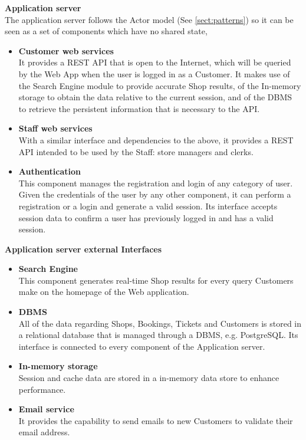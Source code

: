 \textbf{Application server}\\
The application server follows the Actor model (See \ref{sect:patterns}) so it can be seen as a set of components which have no shared state, 
\begin{itemize}
    \item \textbf{Customer web services}\\ It provides a REST API that is open to the Internet, which will be queried by the Web App when the user is logged in as a Customer. It makes use of the Search Engine module to provide accurate Shop results, of the In-memory storage to obtain the data relative to the current session, and of the DBMS to retrieve the persistent information that is necessary to the API.
    \item \textbf{Staff web services}\\ With a similar interface and dependencies to the above, it provides a REST API intended to be used by the Staff: store managers and clerks. 
    \item \textbf{Authentication}\\ This component manages the registration and login of any category of user. Given the credentials of the user by any other component, it can perform a registration or a login and generate a valid session. Its interface accepts session data to confirm a user has previously logged in and has a valid session.
    
\end{itemize}
\textbf{Application server external Interfaces}
\begin{itemize}
    \item \textbf{Search Engine}\\ This component generates real-time Shop results for every query Customers make on the homepage of the Web application.
    \item \textbf{DBMS}\\ All of the data regarding Shops, Bookings, Tickets and Customers is stored in a relational database that is managed through a DBMS, e.g. PostgreSQL. Its interface is connected to every component of the Application server.
    \item \textbf{In-memory storage}\\ Session and cache data are stored in a in-memory data store to enhance performance.
    \item \textbf{Email service}\\ It provides the capability to send emails to new Customers to validate their email address.
\end{itemize}





